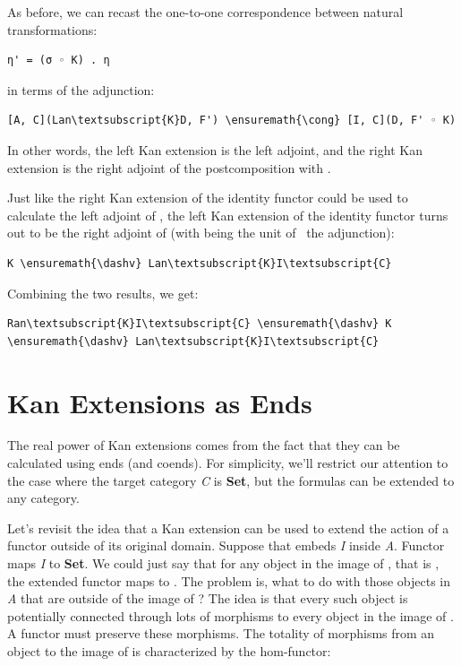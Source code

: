 As before, we can recast the one-to-one correspondence between natural
transformations:

\begin{verbatim}
η' = (σ ◦ K) . η
\end{verbatim}
in terms of the adjunction:

\begin{Verbatim}[commandchars=\\\{\}]
[A, C](Lan\textsubscript{K}D, F') \ensuremath{\cong} [I, C](D, F' ◦ K)
\end{Verbatim}
In other words, the left Kan extension is the left adjoint, and the
right Kan extension is the right adjoint of the postcomposition with
.

Just like the right Kan extension of the identity functor could be used
to calculate the left adjoint of , the left Kan extension of
the identity functor turns out to be the right adjoint of 
(with  being the unit of~ the adjunction):

\begin{Verbatim}[commandchars=\\\{\}]
K \ensuremath{\dashv} Lan\textsubscript{K}I\textsubscript{C}
\end{Verbatim}
Combining the two results, we get:

\begin{Verbatim}[commandchars=\\\{\}]
Ran\textsubscript{K}I\textsubscript{C} \ensuremath{\dashv} K \ensuremath{\dashv} Lan\textsubscript{K}I\textsubscript{C}
\end{Verbatim}

\section{Kan Extensions as Ends}\label{kan-extensions-as-ends}

The real power of Kan extensions comes from the fact that they can be
calculated using ends (and coends). For simplicity, we'll restrict our
attention to the case where the target category \emph{C} is
\textbf{Set}, but the formulas can be extended to any category.

Let's revisit the idea that a Kan extension can be used to extend the
action of a functor outside of its original domain. Suppose that
 embeds \emph{I} inside \emph{A}. Functor  maps
\emph{I} to \textbf{Set}. We could just say that for any object
 in the image of , that is , the
extended functor maps  to . The problem is, what
to do with those objects in \emph{A} that are outside of the image of
? The idea is that every such object is potentially connected
through lots of morphisms to every object in the image of . A
functor must preserve these morphisms. The totality of morphisms from an
object  to the image of  is characterized by the
hom-functor:

